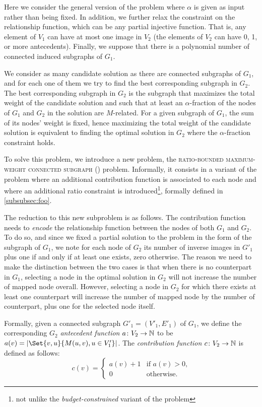 			Here we consider the general version of the \mwccs{} problem where $\alpha$ is given as input rather than being fixed.
			In addition, we further relax the constraint on the relationship function, which can be any partial injective function.
			That is, any element of $V_1$ can have at most one image in $V_2$ (the elements of $V_2$ can have 0, 1, or more antecedents).
			Finally, we suppose that there is a polynomial number of connected induced subgraphs of $G_1$.

			We consider as many candidate solution as there are connected subgraphs of $G_1$, and for each one of them we try to find the best corresponding subgraph in $G_2$.
			The best corresponding subgraph in $G_2$ is the subgraph that maximizes the total weight of the candidate solution and such that at least an $\alpha$-fraction of the nodes of $G_1$ and $G_2$ in the solution are $M$-related.
			For a given subgraph of $G_1$, the sum of its nodes' weight is fixed, hence maximizing the total weight of the candidate solution is equivalent to finding the optimal solution in $G_2$ where the $\alpha$-fraction constraint holds.

			To solve this problem, we introduce a new problem, the \textsc{ratio-bounded maximum-weight connected subgraph} (\rbmwcs) problem.
			Informally, it consists in a variant of the \mwcs{} problem where an additional contribution function is associated to each node and where an additional ratio constraint is introduced\footnote{not unlike the \emph{budget-constrained} variant of the \mwcs{} problem}, formally defined in \cref{subsubsec:foo}.

			The reduction to this new subproblem is as follows.
			The contribution function needs to \emph{encode} the relationship function between the nodes of both $G_1$ and $G_2$.
			To do so, and since we fixed a partial solution to the problem in the form of the subgraph of $G_1$, we note for each node of $G_2$ its number of inverse images in $G'_1$ plus one if and only if at least one exists, zero otherwise.
			The reason we need to make the distinction between the two cases is that when there is no counterpart in $G_1$, selecting a node in the optimal solution in $G_2$ will not increase the number of mapped node overall.
			However, selecting a node in $G_2$ for which there exists at least one counterpart will increase the number of mapped node by the number of counterpart, plus one for the selected node itself.

			Formally, given a connected subgraph $G'_1=(V'_1,E'_1)$ of $G_1$, we define the corresponding $G_2$ \emph{antecedent function} $a\colon V_2 \to \mathbb{N}$ to be $a(v)=\card{\Set{v,u}{M(u,v), u\in V'_1}}$.
			The \emph{contribution function} $c\colon V_2 \to \mathbb{N}$ is defined as follows:
			$$c(v)=\begin{cases}a(v) + 1 &\mbox{if }a(v) > 0\mbox{,} \\
		                       0        &\mbox{otherwise.}
		          \end{cases}$$

